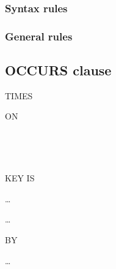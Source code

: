 \subsubsection{Syntax rules}

\subsubsection{General rules}

\subsection{OCCURS clause}

\begin{syntax}

  \begin{1=}
    \integer
    \begin{0-1}
       \integer
    \end{0-1}
    TIMES
    \begin{0-1}
       ON \identifier
    \end{0-1} \\

  \end{1=}

  \begin{0-1}
    \begin{1=}
       \\
    \end{1=}
    KEY IS
    \begin{1=}
      \identifier
    \end{1=}\ldots
  \end{0-1}\ldots

  \begin{0-1}
     BY
    \begin{1=}
      \cobolindexname
    \end{1=}\ldots
  \end{0-1}
\end{syntax}

